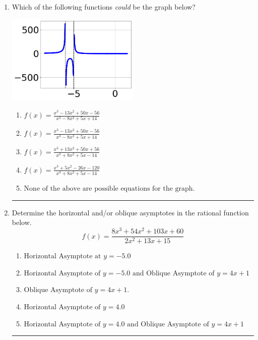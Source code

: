 \documentclass[14pt]{extbook}
\newcommand{\litem}[1]{\item#1\hspace*{-1cm}\rule{\textwidth}{0.4pt}}
\begin{document}
\begin{enumerate}
{\begin{enumerate}[label=\Alph*.]
\end{enumerate} }
\litem{
Which of the following functions \textit{could} be the graph below?
\begin{center}
    \includegraphics[width=0.5\textwidth]{../Figures/identifyGraphOfRationalFunctionB.png}
\end{center}
\begin{enumerate}[label=\Alph*.]
\item \( f(x)=\frac{x^{3} -13 x^{2} +50 x -56}{x^{3} -8 x^{2} +5 x + 14} \)
\item \( f(x)=\frac{x^{3} -13 x^{2} +50 x -56}{x^{3} -8 x^{2} +5 x + 14} \)
\item \( f(x)=\frac{x^{3} +13 x^{2} +50 x + 56}{x^{3} +8 x^{2} +5 x -14} \)
\item \( f(x)=\frac{x^{3} +5 x^{2} -26 x -120}{x^{3} +8 x^{2} +5 x -14} \)
\item \( \text{None of the above are possible equations for the graph.} \)

\end{enumerate} }
\litem{
Determine the horizontal and/or oblique asymptotes in the rational function below.\[ f(x) = \frac{8x^{3} +54 x^{2} +103 x + 60}{2x^{2} +13 x + 15} \]\begin{enumerate}[label=\Alph*.]
\item \( \text{Horizontal Asymptote at } y = -5.0 \)
\item \( \text{Horizontal Asymptote of } y = -5.0 \text{ and Oblique Asymptote of } y = 4x + 1 \)
\item \( \text{Oblique Asymptote of } y = 4x + 1. \)
\item \( \text{Horizontal Asymptote of } y = 4.0  \)
\item \( \text{Horizontal Asymptote of } y = 4.0 \text{ and Oblique Asymptote of } y = 4x + 1 \)


\end{enumerate}}
\end{enumerate}
\end{document}
